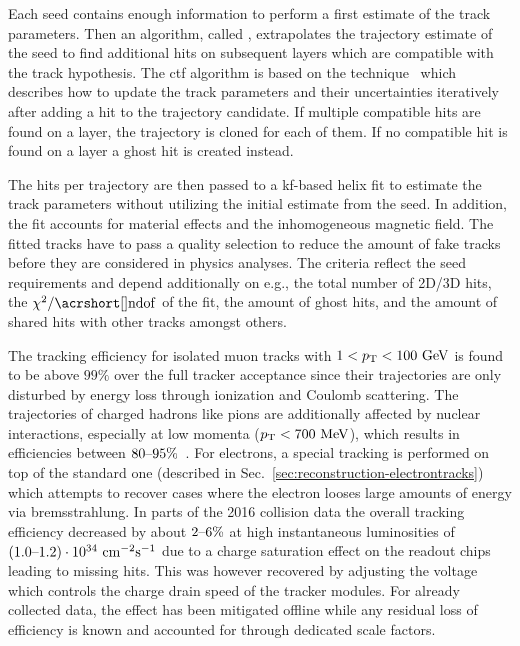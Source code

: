 Each seed contains enough information to perform a first estimate of the track parameters. Then an algorithm, called , extrapolates the trajectory estimate of the seed to find additional hits on subsequent layers which are compatible with the track hypothesis. The \gls{ctf} algorithm is based on the  technique~\cite{Fruhwirth:1987fm,Billoir:1989mh,BILLOIR1990219} which describes how to update the track parameters and their uncertainties iteratively after adding a hit to the trajectory candidate. If multiple compatible hits are found on a layer, the trajectory is cloned for each of them. If no compatible hit is found on a layer a ghost hit is created instead.

The hits per trajectory are then passed to a \gls{kf}-based helix fit to estimate the track parameters without utilizing the initial estimate from the seed. In addition, the fit accounts for material effects and the inhomogeneous magnetic field.  The fitted tracks have to pass a quality selection to reduce the amount of fake tracks before they are considered in physics analyses. The criteria reflect the seed requirements and depend additionally on e.g., the total number of 2D/3D hits, the $\chi^2/\mathrm{\gls{ndof}}$ of the fit, the amount of ghost hits, and the amount of shared hits with other tracks amongst others.

The tracking efficiency for isolated muon tracks with $1<p_\textrm{T}<100~\textrm{GeV}$ is found to be above $99\%$ over the full tracker acceptance since their trajectories are only disturbed by energy loss through ionization and Coulomb scattering. The trajectories of charged hadrons like pions are additionally affected by nuclear interactions, especially at low momenta ($p_\textrm{T}<700~\textrm{MeV}$), which results in efficiencies between $80\text{--}95\%$~\cite{Chatrchyan:2014fea}. For electrons, a special tracking is performed on top of the standard one (described in Sec.~\ref{sec:reconstruction-electrontracks}) which attempts to recover cases where the electron looses large amounts of energy via bremsstrahlung. In parts of the 2016 collision data the overall tracking efficiency decreased by about $2\text{--}6\%$ at high instantaneous luminosities of $(1.0\text{--}1.2)\cdot10^{34}~\mathrm{cm}^{-2}\mathrm{s}^{-1}$ due to a charge saturation effect on the readout chips leading to missing hits. This was however recovered by adjusting the voltage which controls the charge drain speed of the tracker modules. For already collected data, the effect has been mitigated offline while any residual loss of efficiency is known and accounted for through dedicated scale factors.

